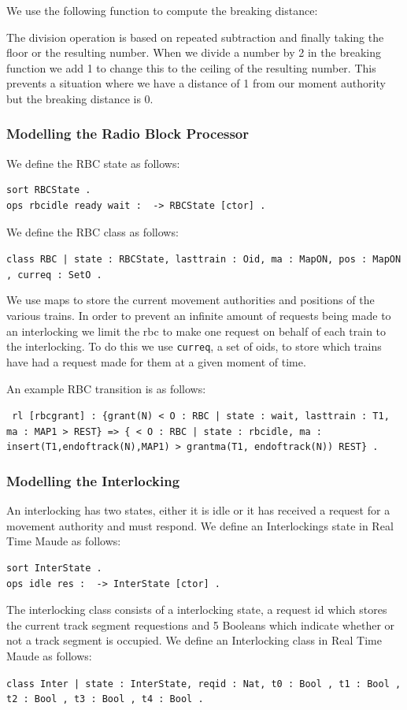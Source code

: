 We use the following function to compute the breaking distance:

The division operation is based on repeated subtraction and finally taking the floor or the resulting number. When we divide a number by 2 in the breaking function we add 1 to change this to the ceiling of the resulting number. This prevents a situation where we have a distance of 1 from our moment authority but the breaking distance is 0.

\subsubsection*{Modelling the Radio Block Processor}
We define the RBC state as follows:

\begin{verbatim}
sort RBCState .
ops rbcidle ready wait :  -> RBCState [ctor] .
\end{verbatim}

We define the RBC class as follows:

\begin{center}
\texttt{class RBC | state : RBCState, lasttrain : Oid, ma : MapON, pos : MapON , curreq : SetO  .}
\end{center}
We use maps to store the current movement authorities and positions of the various trains. In order to prevent an infinite amount of requests being made to an interlocking we limit the rbc to make one request on behalf of each train to the interlocking.  To do this we use  \texttt{curreq}, a set of oids, to store which trains have had a request made for them at a given moment of time.

An example RBC transition is as follows:
\begin{center}
\texttt{ rl [rbcgrant] : \{grant(N) < O : RBC | state : wait, lasttrain : T1, ma : MAP1  > REST\} => \{ < O : RBC | state : rbcidle, ma : insert(T1,endoftrack(N),MAP1) > grantma(T1, endoftrack(N)) REST\} .
}
\end{center}


\subsubsection*{Modelling the Interlocking}
An interlocking has two states, either it is idle or it has received a request for a movement authority and must respond. We define an Interlockings state in Real Time Maude as follows:

\begin{verbatim}
sort InterState .
ops idle res :  -> InterState [ctor] .
\end{verbatim}
The interlocking class consists of a interlocking state, a request id which stores the current track segment requestions and 5 Booleans which indicate whether or not a track segment is occupied. We define an Interlocking class in Real Time Maude as follows:
\begin{center}  
\texttt{class Inter | state : InterState, reqid : Nat, t0 : Bool , t1 : Bool , t2 : Bool , t3 : Bool , t4 : Bool .}
\end{center}

